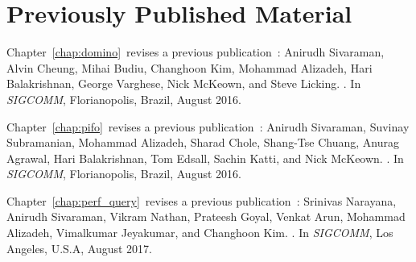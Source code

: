 \chapter*{Previously Published Material}
%

{
\setlength{\parindent}{0 pt}
\setlength{\parskip}{\baselineskip}

Chapter~\ref{chap:domino}~revises a previous
publication~\cite{domino_sigcomm}:
Anirudh Sivaraman, Alvin Cheung, Mihai Budiu, Changhoon Kim, Mohammad Alizadeh, Hari Balakrishnan, George Varghese, Nick McKeown, and Steve Licking.
.
\newblock In {\em SIGCOMM}, Florianopolis, Brazil, August 2016.

Chapter~\ref{chap:pifo}~revises a previous publication~\cite{pifo_sigcomm}: 
Anirudh Sivaraman, Suvinay Subramanian, Mohammad Alizadeh, Sharad Chole, Shang-Tse Chuang, Anurag Agrawal, Hari Balakrishnan, Tom Edsall, Sachin Katti, and Nick McKeown.
.
\newblock In {\em SIGCOMM}, Florianopolis, Brazil, August 2016.

Chapter~\ref{chap:perf_query}~revises a previous publication~\cite{perf_query}:
Srinivas Narayana, Anirudh Sivaraman, Vikram Nathan, Prateesh Goyal, Venkat Arun, Mohammad Alizadeh, Vimalkumar Jeyakumar, and Changhoon Kim.
.
\newblock In {\em SIGCOMM}, Los Angeles, U.S.A, August 2017.
}
